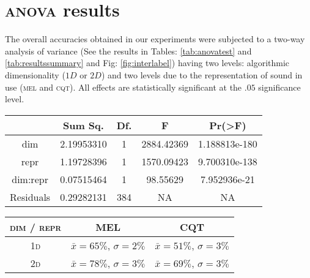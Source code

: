 \section{\textsc{anova} results}

The overall accuracies obtained in our experiments were subjected to a two-way analysis of variance (See the results in Tables: \ref{tab:anovatest} and \ref{tab:resultssummary} and Fig: \ref{fig:interlabel}) having two levels: algorithmic dimensionality ($1D$ or $2D$) and two levels due to the representation of sound in use (\textsc{mel} and \textsc{cqt}). All effects are statistically significant at the $.05$ significance level.

\begin{center}

  \begin{tabular}{c|c|c|c|c}

              & Sum Sq.     & Df.         & F   & Pr(>F) \\
    \hline
    dim       & 2.19953310  & 1   & 2884.42369  & 1.188813e-180 \\
    repr      & 1.19728396  & 1   & 1570.09423  & 9.700310e-138 \\
    dim:repr  & 0.07515464  & 1   & 98.55629    & 7.952936e-21 \\
    Residuals & 0.29282131  & 384 & NA          &  NA \\


  \end{tabular}


  \label{tab:anovatest}

\end{center}

\begin{center}

  \begin{tabular}{c|c|c}

    \textsc{dim / repr} & \textsc{MEL} & \textsc{CQT} \\
    \hline

    \textsc{1d} & $\bar{x} = 65\%$, $\sigma = 2\%$ & $\bar{x} = 51\%$, $\sigma = 3\% $ \\
    \textsc{2d} & $\bar{x} = 78\%$, $\sigma = 3\%$ & $\bar{x} = 69\%$, $\sigma = 3\% $ \\

  \end{tabular}


  \label{tab:resultssummary}

\end{center}


